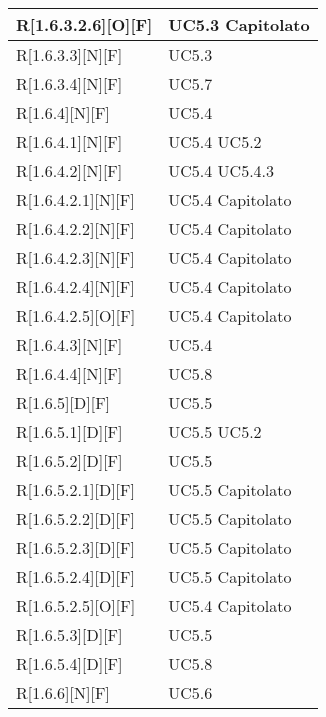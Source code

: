 \begin{longtable}{X | X}
\hline
R[1.6.3.2.6][O][F] & UC5.3 \newline Capitolato \\
\hline
R[1.6.3.3][N][F] & UC5.3 \\
\hline
R[1.6.3.4][N][F] & UC5.7 \\
\hline
R[1.6.4][N][F] & UC5.4 \\
\hline
R[1.6.4.1][N][F] & UC5.4 \newline UC5.2 \\
\hline
R[1.6.4.2][N][F] & UC5.4 \newline UC5.4.3 \\
\hline
R[1.6.4.2.1][N][F] & UC5.4 \newline Capitolato \\
\hline
R[1.6.4.2.2][N][F] & UC5.4 \newline Capitolato \\
\hline
R[1.6.4.2.3][N][F] & UC5.4 \newline Capitolato \\
\hline
R[1.6.4.2.4][N][F] & UC5.4 \newline Capitolato \\
\hline
R[1.6.4.2.5][O][F] & UC5.4 \newline Capitolato \\
\hline
R[1.6.4.3][N][F] & UC5.4 \\
\hline
R[1.6.4.4][N][F] & UC5.8 \\
\hline
R[1.6.5][D][F] & UC5.5 \\
\hline
R[1.6.5.1][D][F] & UC5.5 \newline UC5.2 \\
\hline
R[1.6.5.2][D][F] & UC5.5 \\
\hline
R[1.6.5.2.1][D][F] & UC5.5 \newline Capitolato \\
\hline
R[1.6.5.2.2][D][F] & UC5.5 \newline Capitolato \\
\hline
R[1.6.5.2.3][D][F] & UC5.5 \newline Capitolato \\
\hline
R[1.6.5.2.4][D][F] & UC5.5 \newline Capitolato \\
\hline
R[1.6.5.2.5][O][F] & UC5.4 \newline Capitolato \\
\hline
R[1.6.5.3][D][F] & UC5.5 \\
\hline
R[1.6.5.4][D][F] & UC5.8 \\
\hline
R[1.6.6][N][F] & UC5.6 \\

\end{longtable}
